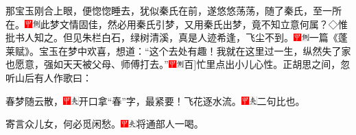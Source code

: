 那宝玉刚合上眼，便惚惚睡去，犹似秦氏在前，遂悠悠荡荡，随了秦氏，至一所在。{\includegraphics[width=3mm]{../Images/00002}\includegraphics[width=3mm]{../Images/00011}\footnotesize \kaishu 此梦文情固佳，然必用秦氏引梦，又用秦氏出梦，竟不知立意何属？◇惟批书人知之。}但见朱栏白石，绿树清溪，真是人迹希逢，飞尘不到。{\includegraphics[width=3mm]{../Images/00002}\includegraphics[width=3mm]{../Images/00011}\footnotesize \kaishu 一篇《蓬莱赋》。}宝玉在梦中欢喜，想道：``这个去处有趣！我就在这里过一生，纵然失了家也愿意，强如天天被父母、师傅打去。''{{\includegraphics[width=3mm]{../Images/00002}\includegraphics[width=3mm]{../Images/00011}\footnotesize \kaishu {(一句)}{[}百{]}忙里点出小儿心性。}}正胡思之间，忽听山后有人作歌曰：

春梦随云散，{\includegraphics[width=3mm]{../Images/00002}\includegraphics[width=3mm]{../Images/00012}\footnotesize \kaishu 开口拿``春''字，最紧要！}飞花逐水流。{\includegraphics[width=3mm]{../Images/00002}\includegraphics[width=3mm]{../Images/00012}\footnotesize \kaishu 二句比也。}

寄言众儿女，何必觅闲愁。{\includegraphics[width=3mm]{../Images/00002}\includegraphics[width=3mm]{../Images/00012}\footnotesize \kaishu 将通部人一喝。}


